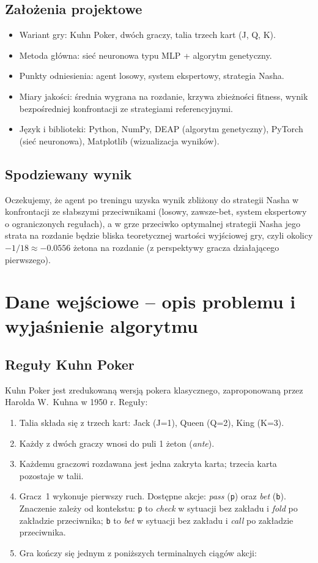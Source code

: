 \documentclass[12pt,a4paper]{article}
\begin{document}
\subsection*{Założenia projektowe}
\begin{itemize}
    \item Wariant gry: Kuhn Poker, dwóch graczy, talia trzech kart (J, Q, K).
    \item Metoda główna: sieć neuronowa typu MLP + algorytm genetyczny.
    \item Punkty odniesienia: agent losowy, system ekspertowy, strategia Nasha.
    \item Miary jakości: średnia wygrana na rozdanie, krzywa zbieżności
          fitness, wynik bezpośredniej konfrontacji ze strategiami referencyjnymi.
    \item Język i biblioteki: Python, NumPy, DEAP (algorytm genetyczny), PyTorch (sieć neuronowa), Matplotlib (wizualizacja wyników).
\end{itemize}

\subsection*{Spodziewany wynik}
Oczekujemy, że agent po treningu uzyska wynik zbliżony do strategii Nasha
w konfrontacji ze słabszymi przeciwnikami (losowy, zawsze-bet, system
ekspertowy o ograniczonych regułach), a w grze przeciwko optymalnej
strategii Nasha jego strata na rozdanie będzie bliska teoretycznej
wartości wyjściowej gry, czyli okolicy $-1/18 \approx -0.0556$ żetona
na rozdanie (z perspektywy gracza działającego pierwszego).

\section{Dane wejściowe -- opis problemu i wyjaśnienie algorytmu}

\subsection{Reguły Kuhn Poker}
Kuhn Poker jest zredukowaną wersją pokera klasycznego, zaproponowaną
przez Harolda W.~Kuhna w 1950 r. Reguły:
\begin{enumerate}
    \item Talia składa się z trzech kart: Jack (J=1), Queen (Q=2), King (K=3).
    \item Każdy z dwóch graczy wnosi do puli 1 żeton (\emph{ante}).
    \item Każdemu graczowi rozdawana jest jedna zakryta karta; trzecia karta pozostaje w talii.
    \item Gracz~1 wykonuje pierwszy ruch. Dostępne akcje:
          \emph{pass} (\texttt{p}) oraz \emph{bet} (\texttt{b}).
          Znaczenie zależy od kontekstu: \texttt{p} to \emph{check} w sytuacji bez zakładu i \emph{fold} po zakładzie przeciwnika; \texttt{b} to \emph{bet} w sytuacji bez zakładu i \emph{call} po zakładzie przeciwnika.
    \item Gra kończy się jednym z poniższych terminalnych ciągów akcji:
\end{enumerate}
\end{document}

